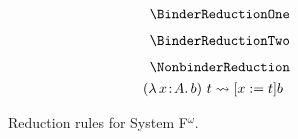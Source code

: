 
\begin{figure}
    \centering
    \begin{minipage}{0.5\textwidth}
        $$\BinderReductionOne$$
    \end{minipage}%
    \begin{minipage}{0.5\textwidth}
        $$\BinderReductionTwo$$
    \end{minipage}%
    $$\NonbinderReduction$$
    \begin{align*}
        ({\lambda}\, x\! : \! A.\, b)\ t &\rightsquigarrow [x := t]b
    \end{align*}
    \caption{Reduction rules for System F$^\omega$.}
    \label{fig:reduction_f}
\end{figure}


